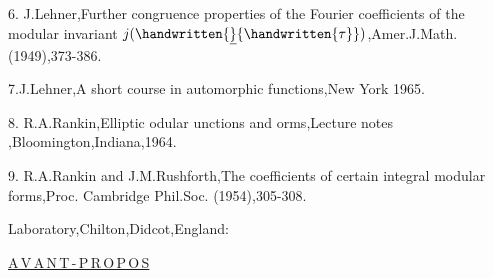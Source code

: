 6. J.Lehner,Further congruence properties of the Fourier coefficients of the modular invariant $j(\handwritten{\underline}{\handwritten{\tau}})$,Amer.J.Math.(1949),373-386.

7.J.Lehner,A short course in automorphic functions,New York 1965.

8. R.A.Rankin,Elliptic odular unctions and orms,Lecture notes ,Bloomington,Indiana,1964.

9. R.A.Rankin and J.M.Rushforth,The coefficients of certain integral modular forms,Proc. Cambridge Phil.Soc. (1954),305-308.\margin{\handwritten{\#}}

   Laboratory,Chilton,Didcot,England:

\noindent\uline{A\,V\,A\,N\,T\,-\,P\,R\,O\,P\,O\,S}

